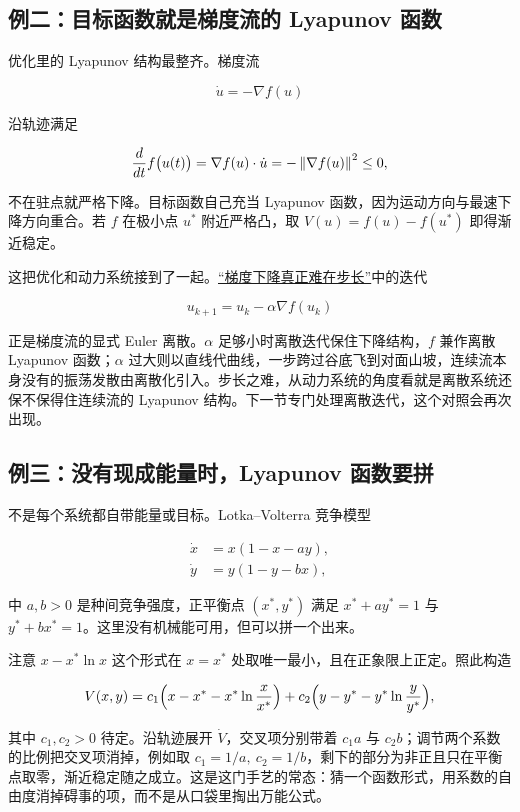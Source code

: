 \subsection{例二：目标函数就是梯度流的 Lyapunov 函数}

优化里的 Lyapunov 结构最整齐。梯度流

\[
\dot u=-\nabla f(u)
\]

沿轨迹满足

\[
\frac{d}{dt}f\bigl(u(t)\bigr)
=\nabla f(u)\cdot\dot u
=-\left\lVert\nabla f(u)\right\rVert^2\le0,
\]

不在驻点就严格下降。目标函数自己充当 Lyapunov 函数，因为运动方向与最速下降方向重合。若 \(f\) 在极小点 \(u^\ast\) 附近严格凸，取 \(V(u)=f(u)-f(u^\ast)\) 即得渐近稳定。

这把优化和动力系统接到了一起。\hyperref[sec:09-Convex-Optimization/06-Optimization-Algorithms/01]{``梯度下降真正难在步长''}中的迭代

\[
u_{k+1}=u_k-\alpha\nabla f(u_k)
\]

正是梯度流的显式 Euler 离散。\(\alpha\) 足够小时离散迭代保住下降结构，\(f\) 兼作离散 Lyapunov 函数；\(\alpha\) 过大则以直线代曲线，一步跨过谷底飞到对面山坡，连续流本身没有的振荡发散由离散化引入。步长之难，从动力系统的角度看就是离散系统还保不保得住连续流的 Lyapunov 结构。下一节专门处理离散迭代，这个对照会再次出现。

\subsection{例三：没有现成能量时，Lyapunov 函数要拼}

不是每个系统都自带能量或目标。Lotka--Volterra 竞争模型

\[
\begin{aligned}
\dot x &= x(1-x-ay),\\
\dot y &= y(1-y-bx),
\end{aligned}
\]

中 \(a,b>0\) 是种间竞争强度，正平衡点 \((x^\ast,y^\ast)\) 满足 \(x^\ast+ay^\ast=1\) 与 \(y^\ast+bx^\ast=1\)。这里没有机械能可用，但可以拼一个出来。

注意 \(x-x^\ast\ln x\) 这个形式在 \(x=x^\ast\) 处取唯一最小，且在正象限上正定。照此构造

\[
V(x,y)=c_1\Bigl(x-x^\ast-x^\ast\ln\frac{x}{x^\ast}\Bigr)
+c_2\Bigl(y-y^\ast-y^\ast\ln\frac{y}{y^\ast}\Bigr),
\]

其中 \(c_1,c_2>0\) 待定。沿轨迹展开 \(\dot V\)，交叉项分别带着 \(c_1a\) 与 \(c_2b\)；调节两个系数的比例把交叉项消掉，例如取 \(c_1=1/a,\ c_2=1/b\)，剩下的部分为非正且只在平衡点取零，渐近稳定随之成立。这是这门手艺的常态：猜一个函数形式，用系数的自由度消掉碍事的项，而不是从口袋里掏出万能公式。

